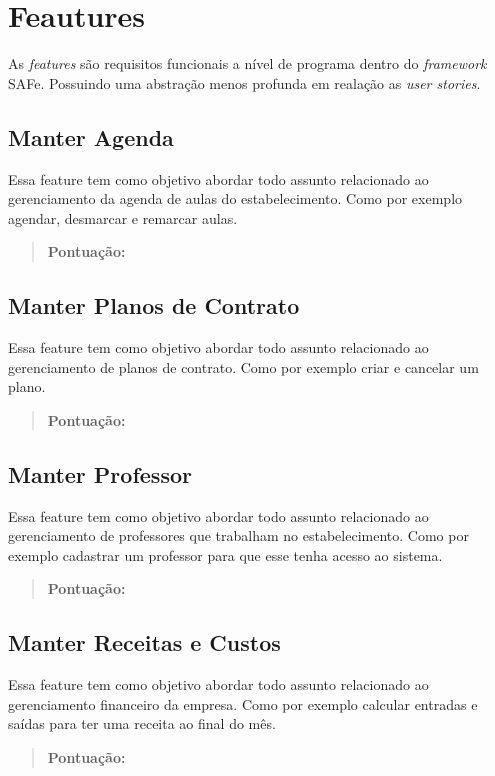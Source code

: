 \section[Features]{Feautures}
As \textsl{features} são requisitos funcionais a nível de programa dentro do
\textsl{framework} SAFe. Possuindo uma abstração menos profunda em realação as
\textsl{user stories}.

\subsection[Manter Agenda]{Manter Agenda}
Essa feature tem como objetivo abordar todo assunto relacionado ao gerenciamento
da agenda de aulas do estabelecimento. Como por exemplo agendar, desmarcar e
remarcar aulas.
\begin{quote}
    \textbf{Pontuação:}
\end{quote}

\subsection[Manter Planos de Contrato]{Manter Planos de Contrato}
Essa feature tem como objetivo abordar todo assunto relacionado ao gerenciamento
de planos de contrato. Como por exemplo criar e cancelar um plano.
\begin{quote}
    \textbf{Pontuação:}
\end{quote}

\subsection[Manter Professor]{Manter Professor}
Essa feature tem como objetivo abordar todo assunto relacionado ao gerenciamento
de professores que trabalham no estabelecimento. Como por exemplo cadastrar
um professor para que esse tenha acesso ao sistema.
\begin{quote}
    \textbf{Pontuação:}
\end{quote}

\subsection[Manter Receitas e Custos]{Manter Receitas e Custos}
Essa feature tem como objetivo abordar todo assunto relacionado ao gerenciamento
financeiro da empresa. Como por exemplo calcular entradas e saídas para ter uma
receita ao final do mês.
\begin{quote}
    \textbf{Pontuação:}
\end{quote}

